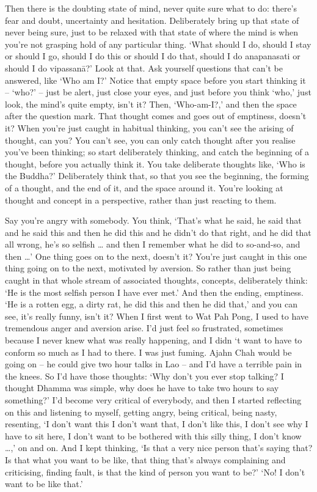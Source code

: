 Then there is the doubting state of mind, never quite sure what to do: there's fear and doubt, uncertainty and hesitation. Deliberately bring up that state of never being sure, just to be relaxed with that state of where the mind is when you're not grasping hold of any particular thing. `What should I do, should I stay or should I go, should I do this or should I do that, should I do anapanasati or should I do vipassanā?' Look at that. Ask yourself questions that can't be answered, like `Who am I?' Notice that empty space before you start thinking it -- `who?' -- just be alert, just close your eyes, and just before you think `who,' just look, the mind's quite empty, isn't it? Then, `Who-am-I?,' and then the space after the question mark. That thought comes and goes out of emptiness, doesn't it? When you're just caught in habitual thinking, you can't see the arising of thought, can you? You can't see, you can only catch thought after you realise you've been thinking; so start deliberately thinking, and catch the beginning of a thought, before you actually think it. You take deliberate thoughts like, `Who is the Buddha?' Deliberately think that, so that you see the beginning, the forming of a thought, and the end of it, and the space around it. You're looking at thought and concept in a perspective, rather than just reacting to them.

Say you're angry with somebody. You think, `That's what he said, he said that and he said this and then he did this and he didn't do that right, and he did that all wrong, he's so selfish \ldots{} and then I remember what he did to so-and-so, and then \ldots{}' One thing goes on to the next, doesn't it? You're just caught in this one thing going on to the next, motivated by aversion. So rather than just being caught in that whole stream of associated thoughts, concepts, deliberately think: `He is the most selfish person I have ever met.' And then the ending, emptiness. `He is a rotten egg, a dirty rat, he did this and then he did that,' and you can see, it's really funny, isn't it? When I first went to Wat Pah Pong, I used to have tremendous anger and aversion arise. I'd just feel so frustrated, sometimes because I never knew what was really happening, and I didn `t want to have to conform so much as I had to there. I was just fuming. Ajahn Chah would be going on -- he could give two hour talks in Lao -- and I'd have a terrible pain in the knees. So I'd have those thoughts: `Why don't you ever stop talking? I thought Dhamma was simple, why does he have to take two hours to say something?' I'd become very critical of everybody, and then I started reflecting on this and listening to myself, getting angry, being critical, being nasty, resenting, `I don't want this I don't want that, I don't like this, I don't see why I have to sit here, I don't want to be bothered with this silly thing, I don't know \ldots{},' on and on. And I kept thinking, `Is that a very nice person that's saying that? Is that what you want to be like, that thing that's always complaining and criticising, finding fault, is that the kind of person you want to be?' `No! I don't want to be like that.'

